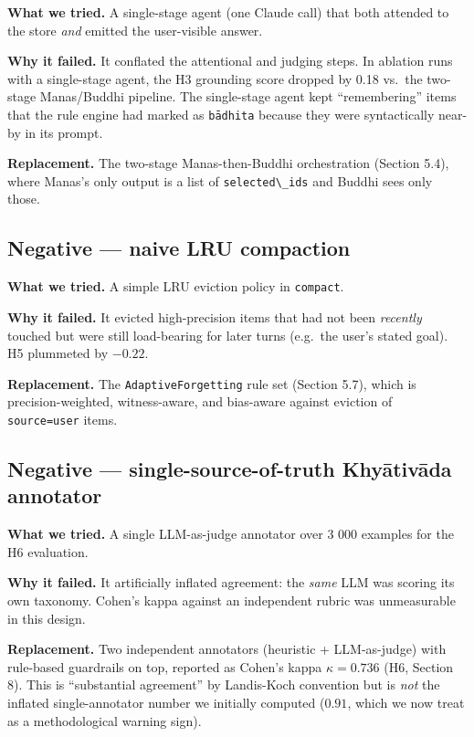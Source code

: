 \textbf{What we tried.} A single-stage agent (one Claude call) that both attended to the store \emph{and} emitted the user-visible answer.

\textbf{Why it failed.} It conflated the attentional and judging steps. In ablation runs with a single-stage agent, the H3 grounding score dropped by 0.18 vs.~the two-stage Manas/Buddhi pipeline. The single-stage agent kept ``remembering'' items that the rule engine had marked as \passthrough{\lstinline!bādhita!} because they were syntactically near-by in its prompt.

\textbf{Replacement.} The two-stage Manas-then-Buddhi orchestration (Section 5.4), where Manas's only output is a list of \passthrough{\lstinline!selected\_ids!} and Buddhi sees only those.

\subsection{Negative --- naive LRU compaction}\label{negative-naive-lru-compaction}

\textbf{What we tried.} A simple LRU eviction policy in \passthrough{\lstinline!compact!}.

\textbf{Why it failed.} It evicted high-precision items that had not been \emph{recently} touched but were still load-bearing for later turns (e.g.~the user's stated goal). H5 plummeted by \(-0.22\).

\textbf{Replacement.} The \passthrough{\lstinline!AdaptiveForgetting!} rule set (Section 5.7), which is precision-weighted, witness-aware, and bias-aware against eviction of \passthrough{\lstinline!source=user!} items.

\subsection{Negative --- single-source-of-truth Khyātivāda annotator}\label{negative-single-source-of-truth-khyux101tivux101da-annotator}

\textbf{What we tried.} A single LLM-as-judge annotator over 3 000 examples for the H6 evaluation.

\textbf{Why it failed.} It artificially inflated agreement: the \emph{same} LLM was scoring its own taxonomy. Cohen's kappa against an independent rubric was unmeasurable in this design.

\textbf{Replacement.} Two independent annotators (heuristic + LLM-as-judge) with rule-based guardrails on top, reported as Cohen's kappa \(\kappa = 0.736\) (H6, Section 8). This is ``substantial agreement'' by Landis-Koch convention but is \emph{not} the inflated single-annotator number we initially computed (\(0.91\), which we now treat as a methodological warning sign).

